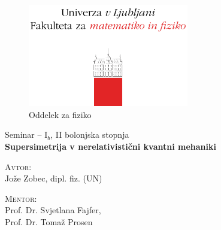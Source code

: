 \begin{titlepage}
	\begin{figure}[H]
		\centering
		\includegraphics[width = 7cm, keepaspectratio=1]{pics/logo.pdf}\\[12pt]
		{\sc Oddelek za fiziko}\\[4cm]
	\end{figure}
	\begin{center}
		\large{Seminar -- I$_b$, II bolonjska stopnja}\\[0.5cm]
		\LARGE\textbf{Supersimetrija v nerelativisti\v cni kvantni mehaniki}\\[1.0cm]

		\vspace{0.0cm}

		\begin{minipage}{0.4\textwidth}\small
			\begin{flushleft}
			\textsc{Avtor:}\\[0.2cm]
			Jo\v ze Zobec, dipl. fiz. (UN)
			\end{flushleft}
		\end{minipage}
		\begin{minipage}{0.4\textwidth}\small
			\begin{flushright}
				\textsc{Mentor:}\\[0.2cm]
				Prof. Dr. Svjetlana Fajfer,\\[0.1cm]
				Prof. Dr. Toma\v z Prosen
			\end{flushright}
		\end{minipage}
	\end{center}

	\vspace{3.5cm}

	\begin{abstract}
		Supersimetrija je \v sir\v se podro\v cje, ki ni omejeno zgolj na fiziko osnovnih
		delcev, pa\v c pa lahko najde rabo tudi drugod v fiziki. V tem seminarju bom pokazal
		ra\v cunske prijeme v obravnavi \v solskih kvantno-mehanskih problemov s pomo\v cjo
		supersimetri\v cnega ogrodja in novosti v teoriji izospektralnih Hamiltonianov ter
		teoriji perturbacij.
	\end{abstract}
	
	\vfill

\end{titlepage}

